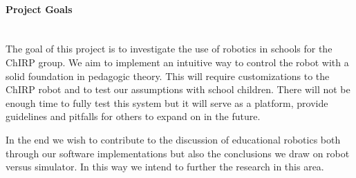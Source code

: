 \paragraph{Project Goals}~\\
The goal of this project is to investigate the use of robotics in schools for the ChIRP group. We aim to implement an intuitive way to control the robot with a solid foundation in pedagogic theory. This will require customizations to the ChIRP robot and to test our assumptions with school children. There will not be enough time to fully test this system but it will serve as a platform, provide guidelines and pitfalls for others to expand on in the future. 

\bigskip\noindent
In the end we wish to contribute to the discussion of educational robotics both through our software implementations but also the conclusions we draw on robot versus simulator. In this way we intend to further the research in this area. 

